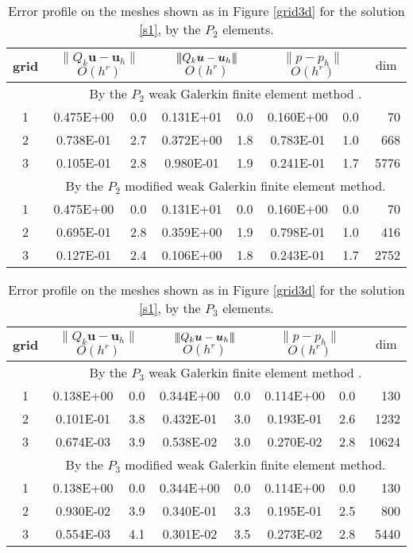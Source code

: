 \documentclass[11pt]{amsart}
\def\3bar{{|\hspace{-.02in}|\hspace{-.02in}|}}
\begin{document}
\begin{table}[ht]
  \centering  \renewcommand{\arraystretch}{1.2}
  \caption{Error profile on the meshes shown as in Figure \ref{grid3d}
    for the solution \eqref{s1}, by the $P_2$ elements. }
  \label{t2}
\begin{tabular}{c|cc|cc|cc|r}
\hline
grid & \multicolumn{2}{c|}{ $\|Q_k \bm{u}-\bm{u}_h\| $    $O(h^r)$}
   & \multicolumn{2}{c|}{  $\3bar{Q_k \bm{u}-\bm{u}_h}\3bar$  $O(h^r)$}
    &  \multicolumn{2}{c|}{ $ \| p-p_h\| $  $O(h^r)$}& $\dim$  
  \\ \hline
    &  \multicolumn{7}{c}{ By the  $P_2$ weak Galerkin finite element method \cite{Mu-W-Y-Z}. }   \\
\hline 
 1&   0.475E+00& 0.0&   0.131E+01& 0.0&   0.160E+00& 0.0&     70 \\
 2&   0.738E-01& 2.7&   0.372E+00& 1.8&   0.783E-01& 1.0&    668 \\
 3&   0.105E-01& 2.8&   0.980E-01& 1.9&   0.241E-01& 1.7&   5776 \\
\hline
    &  \multicolumn{7}{c}{ By the  $P_2$ modified weak Galerkin finite element method. }   \\
\hline
 1&   0.475E+00& 0.0&   0.131E+01& 0.0&   0.160E+00& 0.0&     70 \\
 2&   0.695E-01& 2.8&   0.359E+00& 1.9&   0.798E-01& 1.0&    416 \\
 3&   0.127E-01& 2.4&   0.106E+00& 1.8&   0.243E-01& 1.7&   2752 \\
\hline
    \end{tabular}%
\end{table}%


\begin{table}[ht]
  \centering  \renewcommand{\arraystretch}{1.2}
  \caption{Error profile on the meshes shown as in Figure \ref{grid3d}
    for the solution \eqref{s1}, by the $P_3$ elements. }
  \label{t3}
\begin{tabular}{c|cc|cc|cc|r}
\hline
grid & \multicolumn{2}{c|}{ $\|Q_k \bm{u}-\bm{u}_h\| $    $O(h^r)$}
   & \multicolumn{2}{c|}{  $\3bar{Q_k \bm{u}-\bm{u}_h}\3bar$  $O(h^r)$}
    &  \multicolumn{2}{c|}{ $ \| p-p_h\| $  $O(h^r)$}& $\dim$  
  \\ \hline
    &  \multicolumn{7}{c}{ By the  $P_3$ weak Galerkin finite element method \cite{Mu-W-Y-Z}. }   \\
\hline 
 1&   0.138E+00& 0.0&   0.344E+00& 0.0&   0.114E+00& 0.0&    130 \\
 2&   0.101E-01& 3.8&   0.432E-01& 3.0&   0.193E-01& 2.6&   1232 \\
 3&   0.674E-03& 3.9&   0.538E-02& 3.0&   0.270E-02& 2.8&  10624 \\
\hline
    &  \multicolumn{7}{c}{ By the  $P_3$ modified weak Galerkin finite element method. }   \\
\hline
 1&   0.138E+00& 0.0&   0.344E+00& 0.0&   0.114E+00& 0.0&    130 \\
 2&   0.930E-02& 3.9&   0.340E-01& 3.3&   0.195E-01& 2.5&    800 \\
 3&   0.554E-03& 4.1&   0.301E-02& 3.5&   0.273E-02& 2.8&   5440 \\
\hline
    \end{tabular}%
\end{table}%
\end{document}
